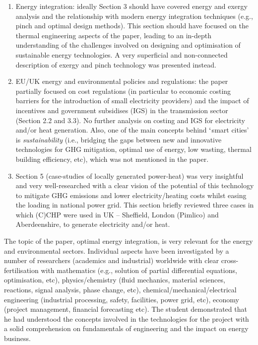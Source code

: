 \documentclass[14pt,twoside]{report}
\begin{document}
\begin{enumerate}
\begin{enumerate}
% 
\item Energy integration: ideally Section 3 should have covered energy and exergy analysis and the relationship with modern energy integration techniques (e.g., pinch and optimal design methods). This section should have focused on the thermal engineering aspects of the paper, leading to an in-depth understanding of the challenges involved on designing and optimisation of sustainable energy technologies. A very superficial and non-connected description of exergy and pinch technology was presented instead.   
%
\item EU/UK energy and environmental policies and regulations: the paper partially focused on cost regulations (in particular to economic costing barriers for the introduction of small electricity providers) and the impact of incentives and government subsidises (IGS) in the transmission sector (Section 2.2 and 3.3). No further analysis on costing and IGS for electricity and/or heat generation. Also, one of the main concepts behind $\lq$smart cities' is {\it sustainability} (i.e., bridging the gaps between new and innovative technologies for GHG mitigation, optimal use of energy, low wasting, thermal building efficiency, etc), which was not mentioned in the paper.
%
\item Section 5 (case-studies of locally generated power-heat) was very insightful and very well-researched with a clear vision of the potential of this technology to mitigate GHG emissions and lower electricity/heating costs whilst easing the loading in national power grid. This section briefly reviewed three cases in which (C)CHP were used in UK -- Sheffield, London (Pimlico) and Aberdeenshire, to generate electricity and/or heat.
\end{enumerate} 
\end{enumerate}

The topic of the paper, optimal energy integration, is very relevant for the energy and environmental sectors. Individual aspects have been investigated by a number of researchers (academics and industrial) worldwide with clear cross-fertilisation with mathematics (e.g., solution of partial differential equations, optimisation, etc), physics/chemistry (fluid mechanics, material sciences, reactions, signal analysis, phase change, etc), chemical/mechanical/electrical engineering (industrial processing, safety, facilities, power grid, etc), economy (project management, financial forecasting etc). The student demonstrated that he had understood the concepts involved in the technologies for the project with a solid comprehension on fundamentals of engineering and the impact on energy business.    
\end{document}
